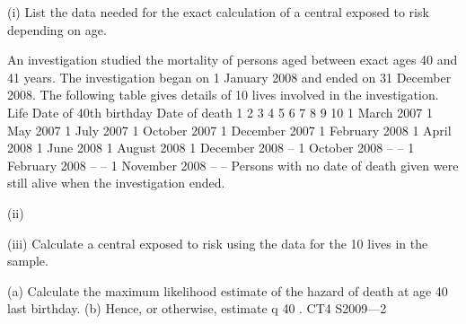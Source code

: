 \documentclass[a4paper,12pt]{article}
\begin{document}
(i) List the data needed for the exact calculation of a central exposed to risk
depending on age.

An investigation studied the mortality of persons aged between exact ages 40 and 41
years. The investigation began on 1 January 2008 and ended on 31 December 2008.
The following table gives details of 10 lives involved in the investigation.
Life Date of 40th birthday Date of death
1
2
3
4
5
6
7
8
9
10 1 March 2007
1 May 2007
1 July 2007
1 October 2007
1 December 2007
1 February 2008
1 April 2008
1 June 2008
1 August 2008
1 December 2008 –
1 October 2008
–
–
1 February 2008
–
–
1 November 2008
–
–
Persons with no date of death given were still alive when the investigation ended.
\item (ii)
\item (iii)
Calculate a central exposed to risk using the data for the 10 lives in the
sample.

(a) Calculate the maximum likelihood estimate of the hazard of death at
age 40 last birthday.
(b) Hence, or otherwise, estimate q 40 .
CT4 S2009—2

\end{document}
